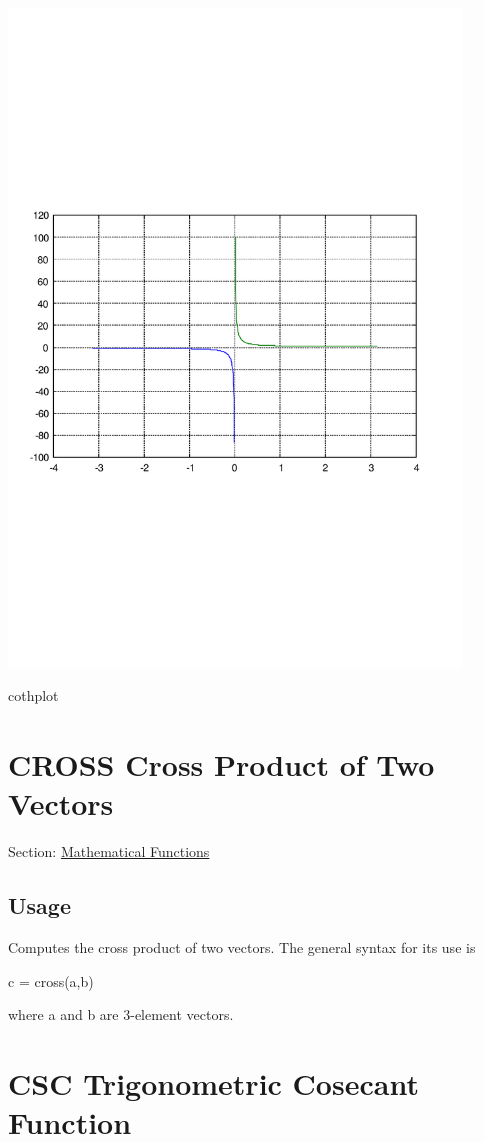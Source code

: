  
\begin{DoxyImage}
\includegraphics[width=12cm]{cothplot}
\caption{cothplot}
\end{DoxyImage}
 \hypertarget{mathfunctions_cross}{}\section{C\-R\-O\-S\-S Cross Product of Two Vectors}\label{mathfunctions_cross}
Section\-: \hyperlink{sec_mathfunctions}{Mathematical Functions} \hypertarget{vtkwidgets_vtkxyplotwidget_Usage}{}\subsection{Usage}\label{vtkwidgets_vtkxyplotwidget_Usage}
Computes the cross product of two vectors. The general syntax for its use is \begin{DoxyVerb}    c = cross(a,b)
\end{DoxyVerb}
 where {\ttfamily a} and {\ttfamily b} are 3-\/element vectors. \hypertarget{mathfunctions_csc}{}\section{C\-S\-C Trigonometric Cosecant Function}\label{mathfunctions_csc}
